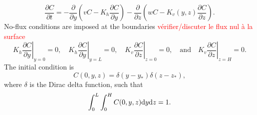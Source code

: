 \begin{equation}\label{eq:C_PDE_dev}
	\frac{\partial C}{\partial t} = -\frac{\partial}{\partial y}\left(vC - K_h\frac{\partial C}{\partial y}\right) -\frac{\partial}{\partial z}\left(wC - K_v(y,z)\frac{\partial C}{\partial z}\right).
\end{equation}
No-flux conditions are imposed at the boundaries \textcolor{red}{vérifier/discuter le flux nul à la surface}
\begin{equation}\label{eq:C_PDE_BC}
	\left. K_h\frac{\partial C}{\partial y} \right|_{y=0} = 0, \quad  \left. K_h\frac{\partial C}{\partial y} \right|_{y=L} = 0, \quad \left. K_v\frac{\partial C}{\partial z} \right|_{z=0} = 0, \quad \mbox{and} \quad \left. K_v\frac{\partial C}{\partial z} \right|_{z=H} = 0.
\end{equation}
The initial condition is
\begin{equation} \label{eq:C_PDE_CI}
	C(0,y,z) = \delta(y-y_*)\delta(z-z_*),
\end{equation}
where $\delta$ is the Dirac delta function, such that
\begin{equation}
	\int_0^L \int_0^H C(0,y,z) \rm dy \rm dz = 1.
\end{equation}

